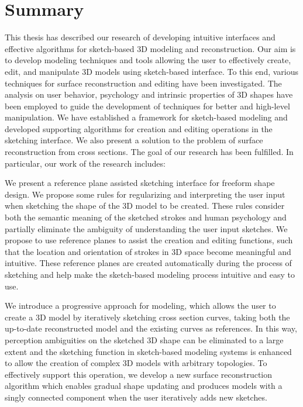 
\section{Summary}\label{ch:conclusion_sec:1}
This thesis has described our research of developing intuitive
interfaces and effective algorithms for sketch-based 3D modeling and
reconstruction. Our aim is to develop modeling techniques and tools
allowing the user to effectively create, edit, and manipulate 3D
models using sketch-based interface. To this end, various techniques
for surface reconstruction and editing have been investigated. The
analysis on user behavior, psychology and intrinsic properties of 3D
shapes have been employed to guide the development of techniques for
better and high-level manipulation. We have established a framework
for sketch-based modeling and developed supporting algorithms for
creation and editing operations in the sketching interface. We also
present a solution to the problem of surface reconstruction from
cross sections. The goal of our research has been fulfilled. In
particular, our work of the research includes:

We present a reference plane assisted sketching  interface for
freeform shape design. We propose some rules for regularizing and
interpreting the user input when sketching the shape of the 3D model
to be created. These rules consider both the semantic meaning of the
sketched strokes and human psychology and partially eliminate the
ambiguity of understanding the user input sketches. We propose to
use reference planes to assist the creation and editing functions,
such that the location and orientation of strokes in 3D space become
meaningful and intuitive. These reference planes are created
automatically during the process of sketching and help make the
sketch-based modeling process intuitive and easy to use.

We introduce a progressive approach for modeling, which allows the
user to create a 3D model by iteratively sketching cross section
curves, taking both the up-to-date reconstructed model and the
existing curves as references. In this way, perception ambiguities
on the sketched 3D shape can be eliminated to a large extent and the
sketching function in sketch-based modeling systems is enhanced to
allow the creation of complex 3D models with arbitrary topologies.
To effectively support this operation, we develop a new surface
reconstruction algorithm which enables gradual shape updating and
produces models with a singly connected component when the user
iteratively adds new sketches.

